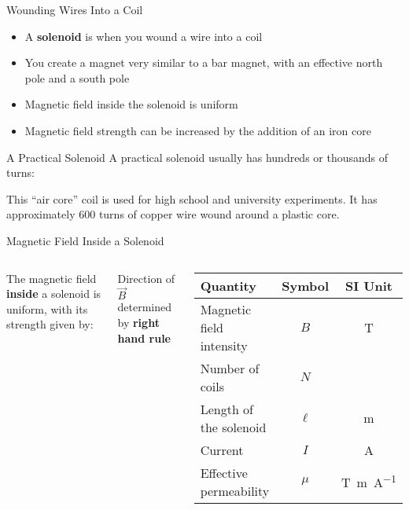 \documentclass[12pt,aspectratio=169]{beamer}
\begin{document}
\begin{frame}{Wounding Wires Into a Coil}
  \begin{itemize}
  \item A \textbf{solenoid} is when you wound a wire into a coil
  \item You create a magnet very similar to a bar magnet, with an effective
    north pole and a south pole
  \item Magnetic field inside the solenoid is uniform
  \item Magnetic field strength can be increased by the addition of an iron core
  \end{itemize}
  \begin{center}
  \end{center}
\end{frame}



\begin{frame}{A Practical Solenoid}
  A practical solenoid usually has hundreds or thousands of turns:
  \begin{center}
  \end{center}

  \vspace{-.2in}
  This ``air core'' coil is used for high school and university experiments. It
  has approximately 600 turns of copper wire wound around a plastic core.
\end{frame}



\begin{frame}{Magnetic Field Inside a Solenoid}
  \begin{columns}
    
    The magnetic field \textbf{inside} a solenoid is uniform, with its strength
    given by:
    
    
    Direction of $\vec B$ determined by \textbf{right hand rule}
    \begin{center}
      \begin{tabular}{l|c|c}
        \rowcolor{pink}
        \textbf{Quantity} & \textbf{Symbol} & \textbf{SI Unit} \\ \hline
        Magnetic field intensity & $B$    & \si\tesla \\
        Number of coils          & $N$    & \\
        Length of the solenoid   & $\ell$ & \si\metre \\
        Current                  & $I$    & \si\ampere \\
        Effective permeability   & $\mu$  & \si{\tesla.\metre\per\ampere}
      \end{tabular}
    \end{center}
  \end{columns}
\end{frame}
\end{document}
